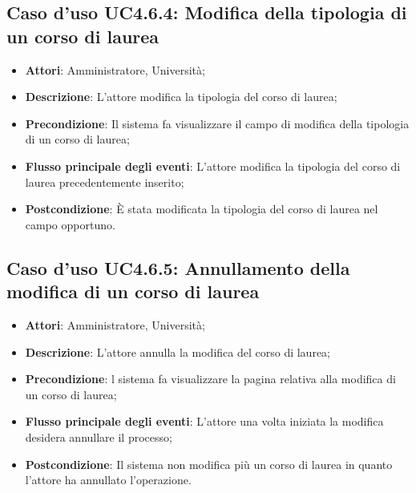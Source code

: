 \subsection{Caso d'uso \texorpdfstring{UC4.6.4}{UC4.6.4}: Modifica della tipologia di un corso di laurea}
\begin{itemize}
\item \textbf{Attori}: Amministratore, Università;
\item \textbf{Descrizione}: L'attore modifica la tipologia del corso di laurea;

\item \textbf{Precondizione}: Il sistema fa visualizzare il campo di modifica della tipologia di un corso di laurea;


\item \textbf{Flusso principale degli eventi}: L'attore modifica la tipologia del corso di laurea precedentemente inserito;

\item \textbf{Postcondizione}: È stata modificata la tipologia del corso di laurea nel campo opportuno.

\end{itemize}
\subsection{Caso d'uso \texorpdfstring{UC4.6.5}{UC4.6.5}: Annullamento della modifica di un corso di laurea}
\begin{itemize}
\item \textbf{Attori}: Amministratore, Università;
\item \textbf{Descrizione}: L'attore annulla la modifica del corso di laurea;

\item \textbf{Precondizione}: l sistema fa visualizzare la pagina relativa alla modifica di un corso di laurea;

\item \textbf{Flusso principale degli eventi}: L'attore una volta iniziata la modifica desidera annullare il processo;

\item \textbf{Postcondizione}: Il sistema non modifica più un corso di laurea in quanto l'attore ha annullato l'operazione.

\end{itemize}
